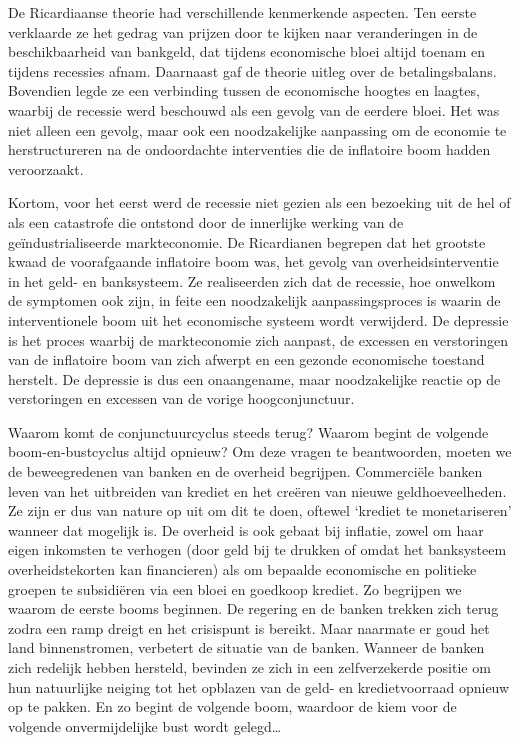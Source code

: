 \documentclass[
  a5paper,
  smalldemyvopaper,10pt,twoside,onecolumn,openright,extrafontsizes,hidelinks]{memoir}
\begin{document}
De Ricardiaanse theorie had verschillende kenmerkende aspecten. Ten
eerste verklaarde ze het gedrag van prijzen door te kijken naar
veranderingen in de beschikbaarheid van bankgeld, dat tijdens
economische bloei altijd toenam en tijdens recessies afnam. Daarnaast
gaf de theorie uitleg over de betalingsbalans. Bovendien legde ze een
verbinding tussen de economische hoogtes en laagtes, waarbij de recessie
werd beschouwd als een gevolg van de eerdere bloei. Het was niet alleen
een gevolg, maar ook een noodzakelijke aanpassing om de economie te
herstructureren na de ondoordachte interventies die de inflatoire boom
hadden veroorzaakt.

Kortom, voor het eerst werd de recessie niet gezien als een bezoeking
uit de hel of als een catastrofe die ontstond door de innerlijke werking
van de geïndustrialiseerde markteconomie. De Ricardianen begrepen dat
het grootste kwaad de voorafgaande inflatoire boom was, het gevolg van
overheidsinterventie in het geld- en banksysteem. Ze realiseerden zich
dat de recessie, hoe onwelkom de symptomen ook zijn, in feite een
noodzakelijk aanpassingsproces is waarin de interventionele boom uit het
economische systeem wordt verwijderd. De depressie is het proces waarbij
de markteconomie zich aanpast, de excessen en verstoringen van de
inflatoire boom van zich afwerpt en een gezonde economische toestand
herstelt. De depressie is dus een onaangename, maar noodzakelijke
reactie op de verstoringen en excessen van de vorige hoogconjunctuur.

Waarom komt de conjunctuurcyclus steeds terug? Waarom begint de volgende
boom-en-bustcyclus altijd opnieuw? Om deze vragen te beantwoorden,
moeten we de beweegredenen van banken en de overheid begrijpen.
Commerciële banken leven van het uitbreiden van krediet en het creëren
van nieuwe geldhoeveelheden. Ze zijn er dus van nature op uit om dit te
doen, oftewel `krediet te monetariseren' wanneer dat mogelijk is. De
overheid is ook gebaat bij inflatie, zowel om haar eigen inkomsten te
verhogen (door geld bij te drukken of omdat het banksysteem
overheidstekorten kan financieren) als om bepaalde economische en
politieke groepen te subsidiëren via een bloei en goedkoop krediet. Zo
begrijpen we waarom de eerste booms beginnen. De regering en de banken
trekken zich terug zodra een ramp dreigt en het crisispunt is bereikt.
Maar naarmate er goud het land binnenstromen, verbetert de situatie van
de banken. Wanneer de banken zich redelijk hebben hersteld, bevinden ze
zich in een zelfverzekerde positie om hun natuurlijke neiging tot het
opblazen van de geld- en kredietvoorraad opnieuw op te pakken. En zo
begint de volgende boom, waardoor de kiem voor de volgende
onvermijdelijke bust wordt gelegd\ldots{}
\end{document}
